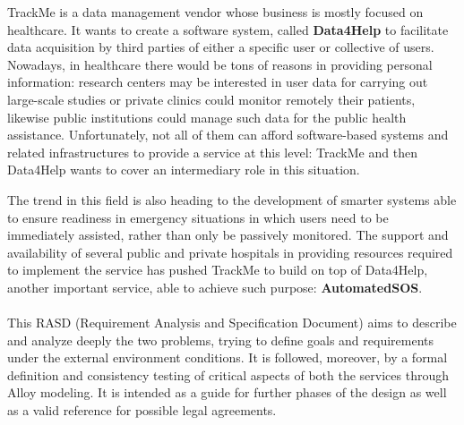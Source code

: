 
\begin{flushleft}
{\raggedright}
TrackMe is a data management vendor whose business is mostly focused on healthcare. It wants to create a software system, called \textbf{Data4Help} to facilitate data acquisition by third parties of either a specific user or collective of users. Nowadays, in healthcare there would be tons of reasons in providing personal information: research centers may be interested in user data for carrying out large-scale studies or private clinics could monitor remotely their patients, likewise public institutions could manage such data for the public health assistance. Unfortunately, not all of them can afford software-based systems and related infrastructures to provide a service at this level: TrackMe and then Data4Help wants to cover an intermediary role in this situation.\par
The trend in this field is also heading to the development of smarter systems able to ensure readiness in emergency situations in which users need to be immediately assisted, rather than only be passively monitored. The support and availability of several public and private hospitals in providing resources required to implement the service has pushed TrackMe to build on top of Data4Help, another important service, able to achieve such purpose: \textbf{AutomatedSOS}. \par
\paragraph{}
This RASD (Requirement Analysis and Specification Document) aims to describe and analyze deeply the two problems, trying to define goals and requirements under the external environment conditions. It is followed, moreover, by a formal definition and consistency testing of critical aspects of both the services through Alloy modeling. It is intended as a guide for further phases of the design as well as a valid reference for possible legal agreements.

{}


\end{flushleft}

